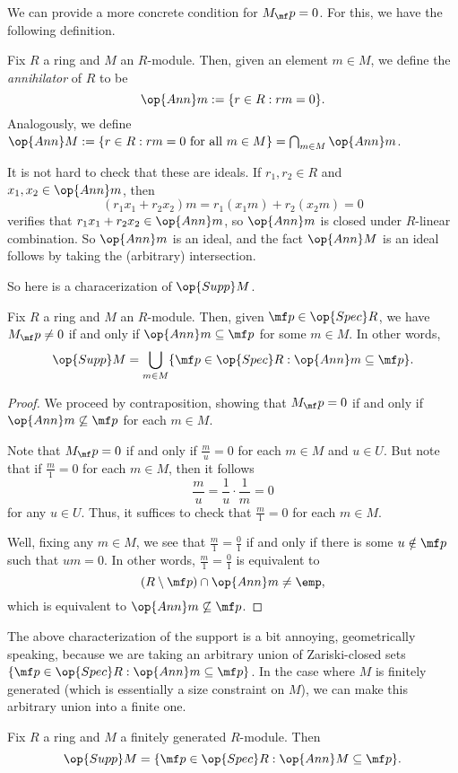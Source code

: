 We can provide a more concrete condition for $M_\mf p=0$. For this, we have the following definition.
\begin{definition}[Annihilator]
	Fix $R$ a ring and $M$ an $R$-module. Then, given an element $m\in M$, we define the \textit{annihilator} of $R$ to be
	\[\op{Ann}m:=\{r\in R:rm=0\}.\]
	Analogously, we define $\op{Ann}M:=\{r\in R:rm=0\text{ for all }m\in M\}=\bigcap_{m\in M}\op{Ann}m$.
\end{definition}
\begin{remark}
	It is not hard to check that these are ideals. If $r_1,r_2\in R$ and $x_1,x_2\in\op{Ann}m$, then
	\[(r_1x_1+r_2x_2)m=r_1(x_1m)+r_2(x_2m)=0\]
	verifies that $r_1x_1+r_2x_2\in\op{Ann}m$, so $\op{Ann}m$ is closed under $R$-linear combination. So $\op{Ann}m$ is an ideal, and the fact $\op{Ann}M$ is an ideal follows by taking the (arbitrary) intersection.
\end{remark}
So here is a characerization of $\op{Supp}M$.
\begin{proposition} \label{prop:generalsupport}
	Fix $R$ a ring and $M$ an $R$-module. Then, given $\mf p\in\op{Spec}R$, we have $M_\mf p\ne0$ if and only if $\op{Ann}m\subseteq\mf p$ for some $m\in M$. In other words,
	\[\op{Supp}M=\bigcup_{m\in M}\{\mf p\in\op{Spec}R:\op{Ann}m\subseteq\mf p\}.\]
\end{proposition}
\begin{proof}
	We proceed by contraposition, showing that $M_\mf p=0$ if and only if $\op{Ann}m\not\subseteq\mf p$ for each $m\in M$.
	
	Note that $M_\mf p=0$ if and only if $\frac mu=0$ for each $m\in M$ and $u\in U$. But note that if $\frac m1=0$ for each $m\in M$, then it follows
	\[\frac mu=\frac1u\cdot\frac1m=0\]
	for any $u\in U$. Thus, it suffices to check that $\frac m1=0$ for each $m\in M$.

	Well, fixing any $m\in M$, we see that $\frac m1=\frac01$ if and only if there is some $u\notin\mf p$ such that $um=0$. In other words, $\frac m1=\frac01$ is equivalent to
	\[(R\setminus\mf p)\cap\op{Ann}m\ne\emp,\]
	which is equivalent to $\op{Ann}m\not\subseteq\mf p$.
\end{proof}
The above characterization of the support is a bit annoying, geometrically speaking, because we are taking an arbitrary union of Zariski-closed sets $\{\mf p\in\op{Spec}R:\op{Ann}m\subseteq\mf p\}$. In the case where $M$ is finitely generated (which is essentially a size constraint on $M$), we can make this arbitrary union into a finite one.
\begin{proposition} \label{prop:fingensupport}
	Fix $R$ a ring and $M$ a finitely generated $R$-module. Then
	\[\op{Supp}M=\{\mf p\in\op{Spec}R:\op{Ann}M\subseteq\mf p\}.\]
\end{proposition}
